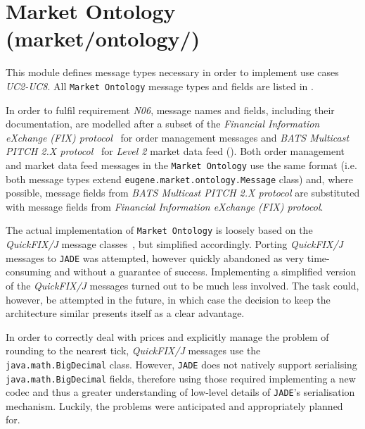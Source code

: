 \section{Market Ontology (market/ontology/)}
\label{Chapters/Implementation/Market-Ontology}
This module defines message types necessary in order to implement use cases  \textit{UC2-UC8}. All \texttt{Market Ontology} message types and fields are listed in .

In order to fulfil requirement \textit{N06}, message names and fields, including their documentation, are modelled after a subset of the \textit{Financial Information eXchange (FIX) protocol}~\cite{FIX5} for order management messages and \textit{BATS Multicast PITCH 2.X protocol}~\cite{BATSPITCH} for \textit{Level 2} market data feed (). Both order management and market data feed messages in the \texttt{Market Ontology} use the same format (i.e. both message types extend \texttt{eugene.market.ontology.Message} class) and, where possible, message fields from \textit{BATS Multicast PITCH 2.X protocol} are substituted with message fields from \textit{Financial Information eXchange (FIX) protocol}.

The actual implementation of \texttt{Market Ontology} is loosely based on the \textit{QuickFIX/J} message classes~\cite{QUICKFIXJ}, but simplified accordingly. Porting \textit{QuickFIX/J} messages to \texttt{JADE} was attempted, however quickly abandoned as very time-consuming and without a guarantee of success. Implementing a simplified version of the \textit{QuickFIX/J} messages turned out to be much less involved. The task could, however, be attempted in the future, in which case the decision to keep the architecture similar presents itself as a clear advantage. 

In order to correctly deal with prices and explicitly manage the problem of rounding to the nearest tick, \textit{QuickFIX/J} messages use the \texttt{java.math.BigDecimal} class. However, \texttt{JADE} does not natively support serialising \texttt{java.math.BigDecimal} fields, therefore using those required implementing a new codec and thus a greater understanding of low-level details of \texttt{JADE}'s serialisation mechanism. Luckily, the problems were anticipated and appropriately planned for.